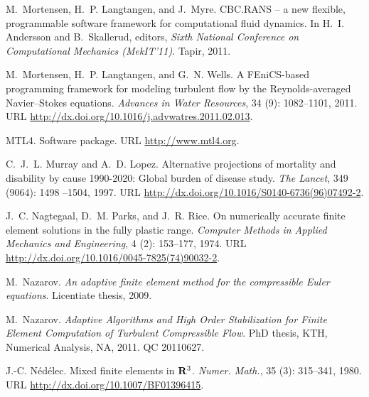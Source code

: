 \begin{thebibliography}{467}
M.~Mortensen, H.~P. Langtangen, and J.~Myre.
\newblock CBC.RANS -- a new flexible, programmable software framework for
  computational fluid dynamics.
\newblock In H.~I. Andersson and B.~Skallerud, editors, \emph{Sixth National
  Conference on Computational Mechanics (MekIT'11)}. Tapir, 2011.

M.~Mortensen, H.~P. Langtangen, and G.~N. Wells.
\newblock A {FEniCS}-based programming framework for modeling turbulent flow by
  the {Reynolds}-averaged {Navier--Stokes} equations.
\newblock \emph{Advances in Water Resources}, 34 (9):  1082--1101, 2011.
\newblock URL \url{http://dx.doi.org/10.1016/j.advwatres.2011.02.013}.

MTL4.
\newblock Software package.
\newblock URL \url{http://www.mtl4.org}.

C.~J.~L. Murray and A.~D. Lopez.
\newblock Alternative projections of mortality and disability by cause
  1990-2020: Global burden of disease study.
\newblock \emph{The Lancet}, 349 (9064): 1498 --1504, 1997.
\newblock URL \url{http://dx.doi.org/10.1016/S0140-6736(96)07492-2}.

J.~C. Nagtegaal, D.~M. Parks, and J.~R. Rice.
\newblock On numerically accurate finite element solutions in the fully plastic
  range.
\newblock \emph{Computer Methods in Applied Mechanics and Engineering},
  4 (2): 153--177, 1974.
\newblock URL \url{http://dx.doi.org/10.1016/0045-7825(74)90032-2}.

M.~Nazarov.
\newblock \emph{An adaptive finite element method for the compressible {E}uler
  equations}.
\newblock Licentiate thesis, 2009.

M.~Nazarov.
\newblock \emph{Adaptive Algorithms and High Order Stabilization for Finite
  Element Computation of Turbulent Compressible Flow}.
\newblock PhD thesis, KTH, Numerical Analysis, NA, 2011.
\newblock QC 20110627.


J.-C. N{\'e}d{\'e}lec.
\newblock Mixed finite elements in {${\bf R}^{3}$}.
\newblock \emph{Numer. Math.}, 35 (3): 315--341, 1980.
\newblock URL \url{http://dx.doi.org/10.1007/BF01396415}.


\end{thebibliography}
